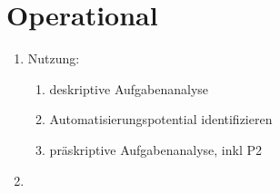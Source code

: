 %
\section{Operational}
\label{sec:zielhierarchie-operational}

\begin{enumerate}
%
\item Nutzung:\\
\begin{enumerate}
\item deskriptive Aufgabenanalyse
\item Automatisierungspotential identifizieren
\item präskriptive Aufgabenanalyse, inkl P2
\end{enumerate}
%
\item 
\end{enumerate}



